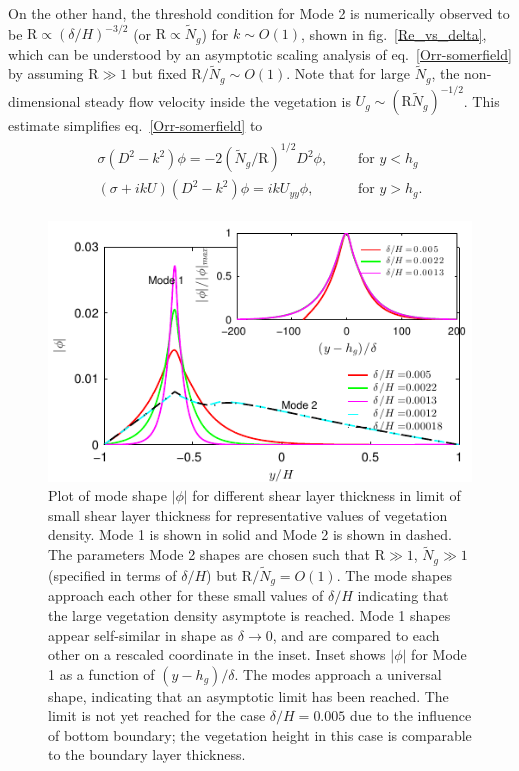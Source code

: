 \documentclass[aps,prl,twocolumn,superscriptaddress,10pt]{revtex4-1}  %
\newcommand{\hg}{h_g}
\newcommand{\Rey}{\text{R}}
\newcommand{\Ndg}{\tilde{N}_g}
\begin{document}
On the other hand, the threshold condition for Mode 2 is numerically observed to be $\Rey \propto ({\delta}/{H})^{-3/2}$ (or $\Rey \propto \Ndg$) for $k\sim O(1)$, shown in fig.~\ref{Re_vs_delta}, which can be understood by an asymptotic scaling analysis of eq.~\eqref{Orr-somerfield} by assuming $\Rey \gg 1$ but fixed $\Rey/\Ndg \sim O(1)$.
Note that for large $\Ndg$, the non-dimensional steady flow velocity inside the vegetation is $U_g \sim (\Rey \Ndg)^{-1/2}$. 
This estimate simplifies eq.~\eqref{Orr-somerfield} to 
\begin{align}
\begin{split}
\sigma\left(D^2-k^2\right)\phi = -2{(\Ndg/\Rey)^{1/2}}D^2\phi,  \quad &\text{ for $y<\hg$}  \\
\left(\sigma+ikU\right) \left(D^2-k^2\right)\phi =  ikU_{yy}\phi, \quad &\text{ for $y>\hg$}.
\end{split}
\label{eqn:mode2asymp}
\end{align}
\begin{figure}
\includegraphics[]{Asymptotic_noshear}
\caption{Plot of mode shape $|\phi|$ for different shear layer thickness in limit of small shear layer thickness for representative values of vegetation density. 
Mode 1 is shown in solid and Mode 2 is shown in dashed. The parameters Mode 2 shapes are chosen such that $\Rey \gg 1$, $\Ndg \gg 1$ (specified in terms of $\delta/H$) but $\Rey/\Ndg = O(1)$. 
The mode shapes approach each other for these small values of $\delta/H$ indicating that the large vegetation density asymptote is reached. Mode 1 shapes appear self-similar in shape as $\delta\to 0$, 
and are compared to each other on a rescaled coordinate in the inset. 
Inset shows $|\phi|$ for Mode 1 as a function of $(y-\hg)/\delta$. The modes approach a universal shape, indicating that an asymptotic limit has been reached. 
The limit is not yet reached for the case $\delta/H = 0.005$ due to the influence of bottom boundary; the vegetation height in this case is comparable to the boundary layer thickness.}
\label{Asymptotic_mode}
\end{figure}
\end{document}

